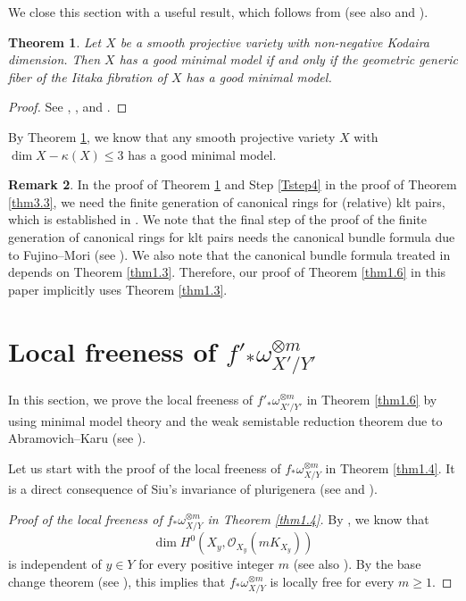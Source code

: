 \documentclass[12pt,twoside]{amsart}
\newtheorem{thm}{Theorem}[section]
\theoremstyle{definition}
\newtheorem{rem}[thm]{Remark}
\begin{document}
We close this section with 
a useful result, which follows from \cite[Theorem 4.4]{lai} 
(see also \cite[Theorem 1.5]{birkar} and \cite[Theorem 2.12]{hacon-xu}). 

\begin{thm}\label{thm3.8} 
Let $X$ be a smooth projective variety with non-negative 
Kodaira dimension. Then $X$ has a good minimal model if and only if 
the geometric generic fiber of the Iitaka fibration of $X$ has a good minimal 
model. 
\end{thm}

\begin{proof}
See \cite[Theorem 4.4]{lai}, \cite[Theorem 5.1]{birkar}, and 
\cite[Theorem 2.12]{hacon-xu}. 
\end{proof}

By Theorem \ref{thm3.8}, 
we know that any smooth projective variety $X$ with 
$\dim X-\kappa (X)\leq 3$ has a good minimal model. 

\begin{rem}\label{rem3.9} 
In the proof of Theorem \ref{thm3.8} and Step \ref{Tstep4} in the 
proof of Theorem \ref{thm3.3}, 
we need the finite generation of canonical rings for 
(relative) klt pairs, which is established in \cite{bchm}. 
We note that the final step of the proof of the finite generation of 
canonical rings for klt pairs needs the canonical bundle formula 
due to Fujino--Mori (see \cite{fujino-mori}). 
We also note that the canonical bundle formula treated in \cite{fujino-mori} 
depends on Theorem \ref{thm1.3}. 
Therefore, our proof of Theorem \ref{thm1.6} in this paper 
implicitly uses Theorem \ref{thm1.3}. 
\end{rem}

\section{Local freeness of $f'_*\omega^{\otimes m}_{X'/Y'}$}\label{sec4}

In this section, we prove the local freeness of $f'_*\omega^{\otimes m}_{X'/Y'}$ 
in Theorem \ref{thm1.6} by using 
minimal model theory and the weak semistable reduction theorem 
due to 
Abramovich--Karu (see \cite{abramovich-karu}). 

Let us start with the proof of the local freeness of 
$f_*\omega^{\otimes m}_{X/Y}$ 
in Theorem \ref{thm1.4}. It is a direct consequence of 
Siu's invariance of plurigenera (see \cite[Corollary 0.2]{siu} and \cite
[Theorem 1]{paun}). 

\begin{proof}[Proof of the local freeness of $f_*\omega^{\otimes m}_{X/Y}$ 
in Theorem \ref{thm1.4}]
By \cite[Corollary 0.2]{siu}, we know that 
$$
\dim H^0(X_y, \mathcal O_{X_y}(mK_{X_y}))
$$ 
is independent of $y\in Y$ for every positive integer $m$ 
(see also \cite[Theorem 1]{paun}). 
By the base change theorem (see \cite[Chapter III, Corollary 12.9]{hartshorne}), 
this implies that 
$f_*\omega^{\otimes m}_{X/Y}$ is locally free for 
every $m\geq 1$. 
\end{proof}
\end{document}
